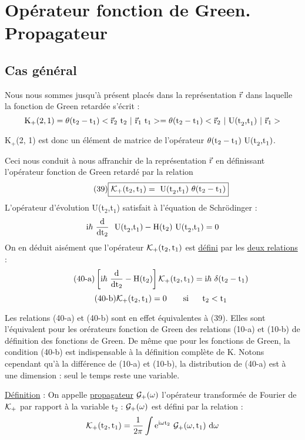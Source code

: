 \section{Opérateur fonction de Green. Propagateur}%

\subsection{Cas général}%

Nous nous sommes jusqu'à présent placés dans la représentation $\vec{\text{r}}$
dans laquelle la fonction de Green retardée s'écrit :
\[
\mt{K}_+(2,1)=\theta(\mt{t}_2-\mt{t}_1)<\vec{\mt{r}}_2\mt{ t}_2\ |\ \vec{\mt{r}}_1\ \mt{t}_1>
=\theta(\mt{t}_2-\mt{t}_1)<\vec{\mt{r}}_2\ |\mt{ U(t}_2\mt{,t}_1)\ |\ \vec{\mt{r}}_1>
\]

K$_+$(2, 1) est donc un élément de matrice de l'opérateur $\theta(\text{t}_2-\text{t}_1)\text{ U(t}_2\text{,t}_1)$.


Ceci nous conduit à nous affranchir de la représentation $\vec{\text{r}}$ en définissant
l'opérateur fonction de Green retardé par la relation
\[
\tag{39}\boxed{\mathcal{K}_+(\text{t}_2,\text{t}_1)=\text{ U(t}_2\text{,t}_1)\ \theta(\text{t}_2-\text{t}_1)}
\]
L'opérateur d'évolution U(t$_2$,t$_1$) satisfait à l'équation de Schrödinger :
\[
\text{i}\hbar\ \frac{\text{d}}{\text{dt}_2}\ \text{ U(t}_2\text{,t}_1)-\text{H}(\text{t}_2)\text{ U(t}_2\text{,t}_1)=0
\]
On en déduit aisément que l'opérateur $\mathcal{K}_+(\text{t}_2,\text{t}_1)$ est \ul{défini} par les
\ul{deux relations} :
\[
\tag{40-a}\left[\mt{i}\hbar\ \frac{\mt{d}}{\mt{dt}_2}-\mt{H}(\mt{t}_2)\right]\mc{K}_+(\mt{t}_2,\mt{t}_1)=\mt{i}\hbar\ \delta(\mt{t}_2-\mt{t}_1)
\]
\[
\tag{40-b}\mc{K}_+(\mt{t}_2,\mt{t}_1)=0 \ \ \ \ \ \ \mt{si}\ \ \ \ \ \mt{t}_2<\mt{t}_1
\]

Les relations (40-a) et (40-b) sont en effet équivalentes à (39). Elles
sont l'équivalent pour les orérateurs fonction de Green des relations
(10-a) et (10-b) de définition des fonctions de Green. De même que pour
les fonctions de Green, la condition (40-b) est indispensable à la définition
complète de K. Notons cependant qu'à la différence de (10-a) et
(10-b), la distribution  de (40-a) est à une dimension : seul le temps
reste une variable.

\ul{Définition} : On appelle \ul{propagateur} $\mathcal{G}_+(\omega)$ l'opérateur transformée de
Fourier de $\mathcal{K}_+$ par rapport à la variable t$_2$ : $\mathcal{G}_+(\omega)$ est défini par la
relation :
\[
\mc{K}_+(\mt{t}_2,\mt{t}_1)=\frac{1}{2\pi} \int\mt{e}^{\mt{i}\omega\mt{t}_2}\ \mc{G}_+(\omega,\mt{t}_1)\ \mt{d}\omega
\]

